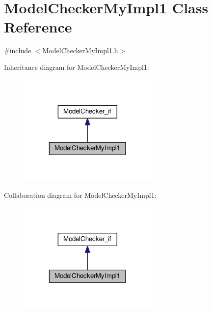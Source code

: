 \hypertarget{class_model_checker_my_impl1}{\section{Model\-Checker\-My\-Impl1 Class Reference}
\label{class_model_checker_my_impl1}
}


{\ttfamily \#include $<$Model\-Checker\-My\-Impl1.\-h$>$}



Inheritance diagram for Model\-Checker\-My\-Impl1\-:\nopagebreak
\begin{figure}[H]
\begin{center}
\leavevmode
\includegraphics[width=196pt]{class_model_checker_my_impl1__inherit__graph}
\end{center}
\end{figure}


Collaboration diagram for Model\-Checker\-My\-Impl1\-:\nopagebreak
\begin{figure}[H]
\begin{center}
\leavevmode
\includegraphics[width=196pt]{class_model_checker_my_impl1__coll__graph}
\end{center}
\end{figure}
